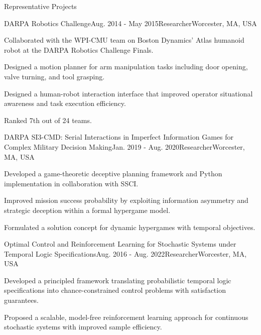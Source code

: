 \documentclass{resume} %
\begin{document}
\begin{rSection}{Representative Projects}

\begin{rSubsection}{DARPA Robotics Challenge}{Aug. 2014 - May 2015}{Researcher}{Worcester, MA, USA}
\item Collaborated with the WPI-CMU team on Boston Dynamics' Atlas humanoid robot at the DARPA Robotics Challenge Finals.
\item Designed a motion planner for arm manipulation tasks including door opening, valve turning, and tool grasping.
\item Designed a human-robot interaction interface that improved operator situational awareness and task execution efficiency.
\item Ranked 7th out of 24 teams.
\end{rSubsection}

\begin{rSubsection}{DARPA SI3-CMD: Serial Interactions in Imperfect Information Games for Complex Military Decision Making}{Jan. 2019 - Aug. 2020}{Researcher}{Worcester, MA, USA}
\item Developed a game-theoretic deceptive planning framework and Python implementation in collaboration with SSCI.
\item Improved mission success probability by exploiting information asymmetry and strategic deception within a formal hypergame model.
\item Formulated a solution concept for dynamic hypergames with temporal objectives.
\end{rSubsection}

\begin{rSubsection}{Optimal Control and Reinforcement Learning for Stochastic Systems under Temporal Logic Specifications}{Aug. 2016 - Aug. 2022}{Researcher}{Worcester, MA, USA}
\item Developed a principled framework translating probabilistic temporal logic specifications into chance-constrained control problems with satisfaction guarantees.
\item Proposed a scalable, model-free reinforcement learning approach for continuous stochastic systems with improved sample efficiency.
\end{rSubsection}

\end{rSection}
\end{document}
